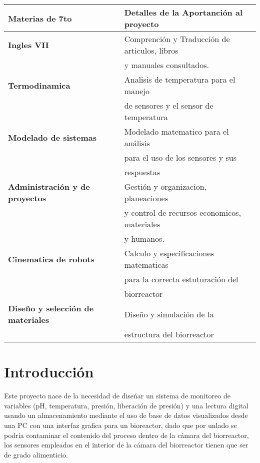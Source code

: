 \documentclass[letter,operight,12pt,spanish]{report}
\begin{document}
\begin{center}
\begin{tabular}{|l|l|}
\hline
	\textbf{Materias de 7to} & \textbf{Detalles de la Aportanci\'on al proyecto}\\
\hline
	\textbf{Ingles VII} & Comprenci\'on y Traducci\'on de articulos, libros\\
	& y manuales consultados.\\
\hline
	\textbf{Termodinamica} & Analisis de temperatura para el manejo \\ & de sensores y el sensor de temperatura\\
\hline	
	\textbf{Modelado de sistemas} & Modelado matematico para el an\'alisis\\
	& para el uso de los sensores y sus\\ & respuestas\\
\hline
	\textbf{Administraci\'on y de proyectos} & Gesti\'on y organizacion, planeaciones\\
	& y control de recursos economicos, materiales\\
	& y humanos.\\
\hline
	\textbf{Cinematica de robots} & Calculo y especificaciones matematicas\\
	& para la correcta estuturaci\'on del\\ & biorreactor\\
\hline
\textbf{Dise\~no y selecci\'on de materiales} & Dise\~no y simulaci\'on de la\\ & estructura del biorreactor\\
\hline
\end{tabular}
\end{center}

\newpage

\section{Introducci\'on}

Este proyecto nace de la necesidad de dise\'nar un sistema de monitoreo de variables (pH, temperatura, presi\'on, liberaci\'on de presi\'on) y una lectura digital usando un almacenamiento mediante el uso de base de datos visualizados desde una PC con una interfaz grafica para un bioreactor, dado que por unlado se podr\'ia contaminar el contenido del proceso dentro de la c\'amara del biorreactor, los sensores empleados en el interior de la c\'amara del biorreactor tienen que ser de grado alimenticio. 
\end{document}
